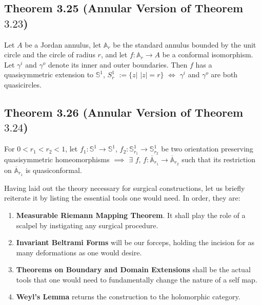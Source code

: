 \documentclass[11pt,a4paper]{article}
\begin{document}
        \subsection*{Theorem 3.25 (Annular Version of Theorem $3.23$)} Let $A$ be a Jordan annulus, let $\mathbb{A}_r$ be the standard annulus bounded by the unit circle and the circle of radius $r$, and let $f:\mathbb{A}_r \rightarrow A$ be a conformal isomorphism. Let $\gamma^i$ and $\gamma^o$ denote its inner and outer boundaries. Then $f$ has a quasisymmetric extension to $\mathbb{S}^1$, $S_r^1$ $:= \{z|$ $|z| = r\}$ $\iff$ $\gamma^i$ and $\gamma^o$ are both quasicircles.



        \subsection*{Theorem 3.26 (Annular Version of Theorem $3.24$)} For $0<r_1<r_2<1$, let $f_1:\mathbb{S}^1 \rightarrow \mathbb{S}^1$, $f_2:\mathbb{S}^1_{r_1} \rightarrow \mathbb{S}^1_{r_2}$ be two orientation preserving quasisymmetric homeomorphisms $\implies$ $\exists$ $f$, $f: \overline{\mathbb{A}}_{r_1}\rightarrow \overline{\mathbb{A}}_{r_2}$ such that its restriction on $\overline{\mathbb{A}}_{r_1}$ is quasiconformal.




        Having laid out the theory necessary for surgical constructions, let us briefly reiterate it by listing the essential tools one would need. In order, they are:
        \begin{enumerate}
            \item \textbf{Measurable Riemann Mapping Theorem}. It shall play the role of a scalpel by instigating any surgical procedure.
            \item \textbf{Invariant Beltrami Forms} will be our forceps, holding the incision for as many deformations as one would desire.
            \item \textbf{Theorems on Boundary and Domain Extensions} shall be the actual tools that one would need to fundamentally change the nature of a self map.
            \item \textbf{Weyl's Lemma} returns the construction to the holomorphic category.
        \end{enumerate}

\end{document}
